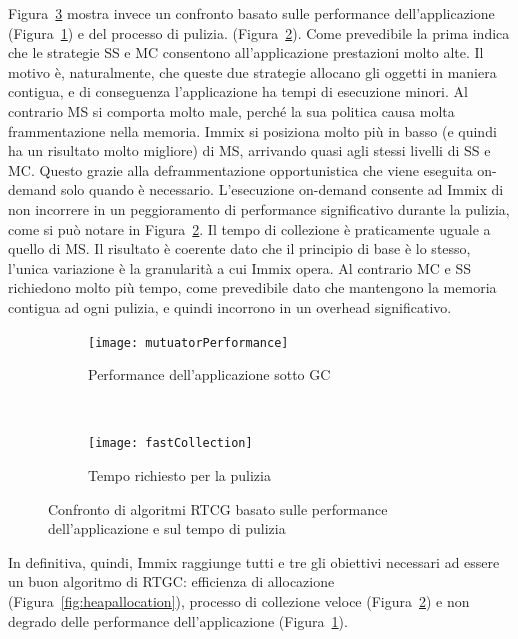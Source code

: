 Figura~\ref{fig:rtgc} mostra invece un confronto basato sulle performance dell'applicazione (Figura~\ref{fig:mutuatorPerformance}) e del processo di pulizia. (Figura~\ref{fig:fastCollection}). Come prevedibile la prima indica che le strategie SS e MC consentono all'applicazione prestazioni molto alte. Il motivo è, naturalmente, che queste due strategie allocano gli oggetti in maniera contigua, e di conseguenza l'applicazione ha tempi di esecuzione minori. Al contrario MS si comporta molto male, perché la sua politica causa molta frammentazione nella memoria. Immix si posiziona molto più in basso (e quindi ha un risultato molto migliore) di MS, arrivando quasi agli stessi livelli di SS e MC. Questo grazie alla deframmentazione opportunistica che viene eseguita on-demand solo quando è necessario. L'esecuzione on-demand consente ad Immix di non incorrere in un peggioramento di performance significativo durante la pulizia, come si può notare in Figura~\ref{fig:fastCollection}. Il tempo di collezione è praticamente uguale a quello di MS. Il risultato è coerente dato che il principio di base è lo stesso, l'unica variazione è la granularità a cui Immix opera. Al contrario MC e SS richiedono molto più tempo, come prevedibile dato che mantengono la memoria contigua ad ogni pulizia, e quindi incorrono in un overhead significativo.
\begin{figure}
	\centering
	\begin{subfigure}[b]{0.4\textwidth}
		\texttt{[image: mutuatorPerformance]}
		\caption{Performance dell'applicazione sotto GC}
		\label{fig:mutuatorPerformance}
	\end{subfigure}
	~
	\begin{subfigure}[b]{0.4\textwidth}
		\texttt{[image: fastCollection]}
		\caption{Tempo richiesto per la pulizia}
		\label{fig:fastCollection}
	\end{subfigure}
	\caption[Confronto di algoritmi RTCG]{Confronto di algoritmi RTCG basato sulle performance dell'applicazione e sul tempo di pulizia}\label{fig:rtgc}
\end{figure}

In definitiva, quindi, Immix raggiunge tutti e tre gli obiettivi necessari ad essere un buon algoritmo di RTGC: efficienza di allocazione (Figura~\ref{fig:heapallocation}), processo di collezione veloce (Figura~\ref{fig:fastCollection}) e non degrado delle performance dell'applicazione (Figura~\ref{fig:mutuatorPerformance}).
